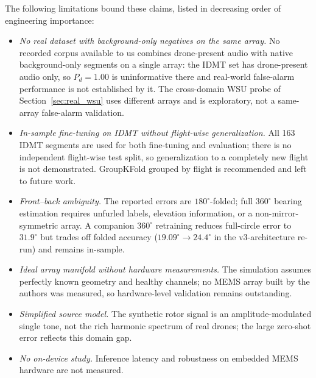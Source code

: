 \documentclass[5p,twocolumn]{elsarticle}
\begin{document}
The following limitations bound these claims, listed in decreasing order of engineering importance:
\begin{itemize}
    \item \emph{No real dataset with background-only negatives on the same array.} No recorded corpus available to us combines drone-present audio with native background-only segments on a single array: the IDMT set has drone-present audio only, so $P_d=1.00$ is uninformative there and real-world false-alarm performance is not established by it. The cross-domain WSU probe of Section~\ref{sec:real_wsu} uses different arrays and is exploratory, not a same-array false-alarm validation.
    \item \emph{In-sample fine-tuning on IDMT without flight-wise generalization.} All 163 IDMT segments are used for both fine-tuning and evaluation; there is no independent flight-wise test split, so generalization to a completely new flight is not demonstrated. GroupKFold grouped by flight is recommended and left to future work.
    \item \emph{Front--back ambiguity.} The reported errors are $180^\circ$-folded; full $360^\circ$ bearing estimation requires unfurled labels, elevation information, or a non-mirror-symmetric array. A companion $360^\circ$ retraining reduces full-circle error to $31.9^\circ$ but trades off folded accuracy ($19.09^\circ\to24.4^\circ$ in the v3-architecture re-run) and remains in-sample.
    \item \emph{Ideal array manifold without hardware measurements.} The simulation assumes perfectly known geometry and healthy channels; no MEMS array built by the authors was measured, so hardware-level validation remains outstanding.
    \item \emph{Simplified source model.} The synthetic rotor signal is an amplitude-modulated single tone, not the rich harmonic spectrum of real drones; the large zero-shot error reflects this domain gap.
    \item \emph{No on-device study.} Inference latency and robustness on embedded MEMS hardware are not measured.
\end{itemize}
\end{document}
